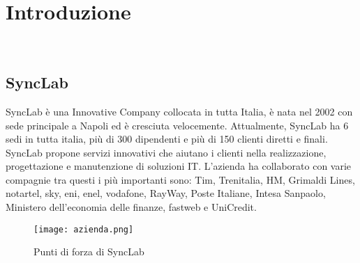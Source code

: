 
\chapter{Introduzione}
\label{cap:introduzione}




\\
\section{SyncLab}
SyncLab è una Innovative Company collocata in tutta Italia, è nata nel 2002 con sede principale a Napoli ed è cresciuta velocemente. Attualmente, SyncLab ha 6 sedi in tutta italia, più di 300 dipendenti e più di 150 clienti diretti e finali.\\
SyncLab propone servizi innovativi che aiutano i clienti nella realizzazione, progettazione e manutenzione di soluzioni IT.
L'azienda ha collaborato con varie compagnie tra questi i più importanti sono: Tim, Trenitalia, HM, Grimaldi Lines, notartel, sky, eni, enel, vodafone, RayWay, Poste Italiane, Intesa Sanpaolo, Ministero dell'economia delle finanze, fastweb e UniCredit.
\begin{figure}[H]
    \centering
    \texttt{[image: azienda.png]}
    \caption{Punti di forza di SyncLab}
\end{figure}
